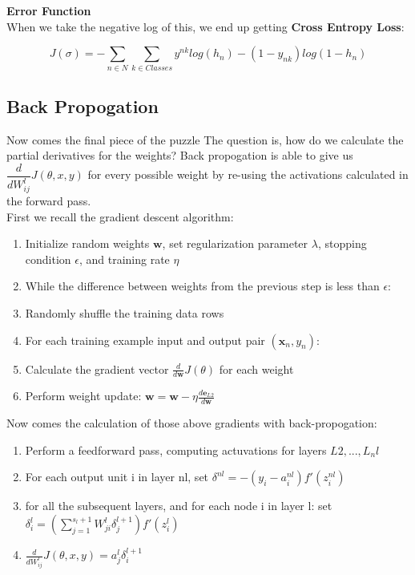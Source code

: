 \documentclass[a4paper]{article}
\begin{document}
    \textbf{Error Function} \\
    When we take the negative log of this, we end up getting \textbf{Cross Entropy Loss}: 
    
    $$J(\sigma) = -\sum_{n \in N} \sum_{k \in Classes} y^{nk} log(h_{n}) - (1-y_{nk})log(1-h_n)$$
   
    \subsection{Back Propogation}
   
    Now comes the final piece of the puzzle
    The question is, how do we calculate the partial derivatives for the weights? Back propogation is able to give us $\dfrac{d}{d W_{ij}^{l}}J(\theta, x, y)$ for every possible weight by re-using the activations calculated in the forward pass. \\ 
    
    First we recall the gradient descent algorithm:
    
    \begin{enumerate}
	
	\item Initialize random weights $\pmb{w}$, set regularization parameter $\lambda$, stopping condition $\epsilon$, and training rate $\eta$
	\item While the difference between weights from the previous step is less than $\epsilon$:
	
	\setlength{\itemindent}{2em}
	\item Randomly shuffle the training data rows
	\item For each training example input and output pair $(\pmb{x}_n, y_n)$:
	
	\setlength{\itemindent}{4em}
	\item Calculate the gradient vector 
	$\frac{d}{d\pmb{w}}J(\theta)$ for each weight \newline 
	
	\item Perform weight update: $\pmb{w} = \pmb{w} - \eta \frac{d\pmb{e}_{L2}}{d\pmb{w}}$
   
	\end{enumerate}
        
    Now comes the calculation of those above gradients with back-propogation: 
    
    \begin{enumerate}
     \item Perform a feedforward pass, computing actuvations for layers $L2,...,L_nl$
     \item For each output unit i in layer nl, set $\delta^{nl} = -(y_i - a_i^{nl})f'(z_i^{nl})$ 
     \item for all the subsequent layers, and for each node i in layer l: set $\delta_i^l = (\sum_{j=1}^{s_l+1}W_{ji}^{l}\delta_j^{l+1})f'(z_i^l)$
     \item $\frac{d}{dW_{ij}^l}J(\theta, x, y) = a_j^l\delta_i^{l+1}$
    \end{enumerate}
\end{document}
